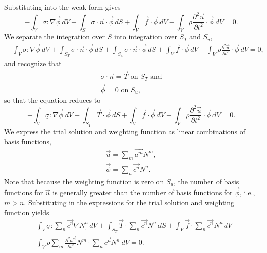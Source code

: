 Substituting into the weak form gives
\begin{equation}
-\int_{V}\underline{\sigma}:\nabla\overrightarrow{\phi}\, dV+\int_{S}\underline{\sigma}\cdot\overrightarrow{n}\cdot\overrightarrow{\phi}\, dS+\int_{V}\overrightarrow{f}\cdot\overrightarrow{\phi}\, dV-\int_{V}\rho\frac{\partial^{2}\overrightarrow{u}}{\partial t^{2}}\cdot\overrightarrow{\phi}\, dV=0.
\end{equation}
We separate the integration over $S$ into integration over $S_{T}$
and $S_{u}$,
\begin{multline}
-\int_{V}\underline{\sigma}:\nabla\overrightarrow{\phi}\, dV+\int_{S_{T}}\underline{\sigma}\cdot\overrightarrow{n}\cdot\overrightarrow{\phi}\, dS+\int_{S_{u}}\underline{\sigma}\cdot\overrightarrow{n}\cdot\overrightarrow{\phi}\, dS+\int_{V}\overrightarrow{f}\cdot\overrightarrow{\phi}\, dV-\int_{V}\rho\frac{\partial^{2}\overrightarrow{u}}{\partial t^{2}}\cdot\overrightarrow{\phi}\, dV=0,
\end{multline}
and recognize that
\begin{gather}
\underline{\sigma}\cdot\overrightarrow{n}=\overrightarrow{T}\text{ on }S_{T}\text{ and}\\
\overrightarrow{\phi}=0\text{ on }S_{u},
\end{gather}
so that the equation reduces to
\begin{equation}
-\int_{V}\underline{\sigma}:\nabla\overrightarrow{\phi}\: dV+\int_{S_{T}}\overrightarrow{T}\cdot\overrightarrow{\phi}\, dS+\int_{V}\overrightarrow{f}\cdot\overrightarrow{\phi}\, dV-\int_{V}\rho\frac{\partial^{2}\overrightarrow{u}}{\partial t^{2}}\cdot\overrightarrow{\phi}\, dV=0.
\end{equation}
We express the trial solution and weighting function as linear combinations
of basis functions,
\begin{gather}
\vec{u}=\sum_{m}\overrightarrow{a^{m}}N^{m},\\
\vec{\phi}=\sum_{n}\overrightarrow{c^{n}}N^{n}.
\end{gather}
Note that because the weighting function is zero on $S_{u}$, the
number of basis functions for $\vec{u}$ is generally greater than
the number of basis functions for $\vec{\phi}$, i.e., $m>n$. Substituting
in the expressions for the trial solution and weighting function yields
\begin{multline}
-\int_{V}\underline{\sigma}:\sum_{n}\overrightarrow{c^{n}}\nabla N_{,}^{n}\, dV+\int_{S_{T}}\vec{T}\cdot\sum_{n}\overrightarrow{c^{n}}N^{n}\, dS+\int_{V}\vec{f}\cdot\sum_{n}\overrightarrow{c^{n}}N^{n}\, dV\\
-\int_{V}\rho\sum_{m}\frac{\partial^{2}\overrightarrow{a^{m}}}{\partial t^{2}}N^{m}\cdot\sum_{n}\overrightarrow{c^{n}}N^{n}\ dV=0.
\end{multline}
